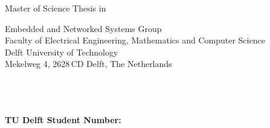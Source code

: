 
%
%
%
%

\begin{titlepage}

\begin{center}
\null\vfill
\begin{center}
\LARGE{\reportTitle}
\end{center}

\vspace{3cm}

\begin{large}
Master of Science Thesis in \reportMSC
\end{large}

\vspace{1.5cm}

\begin{normalsize}
Embedded and Networked Systems Group\\
Faculty of Electrical Engineering, Mathematics and Computer Science\\
Delft University of Technology\\
Mekelweg 4, 2628\,CD Delft, The Netherlands
\end{normalsize}

\vspace{2.0cm}

\begin{normalsize}
\reportAuthor \\
\reportUrlEmailTUD \\
\reportUrlEmailNonTUD\\
\textbf{TU Delft Student Number:} \studentNumber
\end{normalsize}

\vspace{1.0cm}

\reportDate

\vfill
\end{center}

\end{titlepage}
